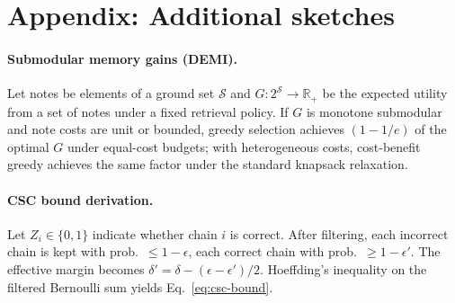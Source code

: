 \documentclass[11pt]{article}
\newcommand{\1}{\mathbb{I}}
\newcommand{\R}{\mathbb{R}}
\begin{document}
\appendix

\section*{Appendix: Additional sketches}

\paragraph{Submodular memory gains (DEMI).}
Let notes be elements of a ground set $\mathcal{S}$ and $G:2^{\mathcal{S}}\to\R_+$ be the expected utility from a set of notes under a fixed retrieval policy. If $G$ is monotone submodular and note costs are unit or bounded, greedy selection achieves $(1-1/e)$ of the optimal $G$ under equal-cost budgets; with heterogeneous costs, cost-benefit greedy achieves the same factor under the standard knapsack relaxation.

\paragraph{CSC bound derivation.}
Let $Z_i \in \{0,1\}$ indicate whether chain $i$ is correct. After filtering, each incorrect chain is kept with prob.\ $\le 1-\epsilon$, each correct chain with prob.\ $\ge 1-\epsilon'$. The effective margin becomes $\delta'=\delta - (\epsilon-\epsilon')/2$. Hoeffding's inequality on the filtered Bernoulli sum yields Eq.~\eqref{eq:csc-bound}.
\end{document}
